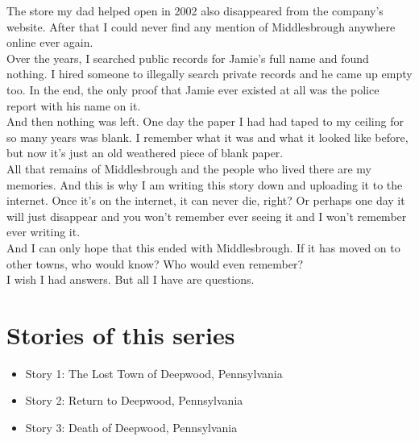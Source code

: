 \documentclass[a5paper]{scrartcl}
\begin{document}
The store my dad helped open in 2002 also disappeared from the company's website. After that I could never find any mention of Middlesbrough anywhere online ever again.\\


Over the years, I searched public records for Jamie's full name and found nothing. I hired someone to illegally search private records and he came up empty too. In the end, the only proof that Jamie ever existed at all was the police report with his name on it.\\


And then nothing was left.  One day the paper I had had taped to my ceiling for so many years was blank. I remember what it was and what it looked like before, but now it's just an old weathered piece of blank paper.\\


All that remains of Middlesbrough and the people who lived there are my memories. And this is why I am writing this story down and uploading it to the internet. Once it's on the internet, it can never die, right? Or perhaps one day it will just disappear and you won't remember ever seeing it and I won't remember ever writing it.\\


And I can only hope that this ended with Middlesbrough. If it has moved on to other towns, who would know? Who would even remember? \\


I wish I had answers. But all I have are questions.
\clearpage
\section*{Stories of this series}

\begin{itemize}
    \item Story 1: The Lost Town of Deepwood, Pennsylvania
    \item Story 2: Return to Deepwood, Pennsylvania
    \item Story 3: Death of Deepwood, Pennsylvania
\end{itemize}
\end{document}
